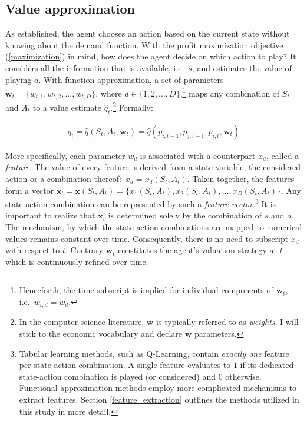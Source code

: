 \subsection{Value approximation}\label{value_approximation}

As established, the agent chooses an action based on the current state without knowing about the demand function. With the profit maximization objective (\autoref{maximization}) in mind, how does the agent decide on which action to play? It considers all the information that is available, i.e.\ $s$, and estimates the value of playing $a$. With function approximation, a set of parameters $\boldsymbol{w}_t = \{w_{t, 1}, w_{t, 2}, ..., w_{t, D}\}$, where $d \in \{1, 2, ..., D\}$,\footnote{Henceforth, the time subscript is implied for individual components of $\boldsymbol{w}_t$, i.e.\ $w_{t,d} = w_d$.} maps any combination of $S_t$ and $A_t$ to a value estimate $\hat{q}_t$.\footnote{In the computer science literature, $\boldsymbol{w}$ is typically referred to as \emph{weights}. I will stick to the economic vocabulary and declare $\boldsymbol{w}$ parameters.} Formally:

\begin{gather}\label{q_estimation}
	\hat{q}_t = \hat{q}(S_t,A_t,\boldsymbol{w}_t) = \hat{q}(p_{i, t-1}, p_{j, t-1}, p_{i, t}, \boldsymbol{w}_t)
\end{gather}

More specifically, each parameter $w_d$ is associated with a counterpart $x_d$, called a \emph{feature}. The value of every feature is derived  from a state variable, the considered action or a combination thereof:\ $x_d = x_d(S_t, A_t)$. Taken together, the features form a vector $\boldsymbol{x}_t = \boldsymbol{x}(S_t, A_t) = \{x_1(S_t, A_t), x_2(S_t, A_t), ..., x_D(S_t, A_t)\}$. Any state-action combination can be represented by such a \emph{feature vector}.\footnote{Tabular learning methods, such as Q-Learning, contain \emph{exactly one} feature per state-action combination. A single feature evaluates to $1$ if its dedicated state-action combination is played (or considered) and $0$ otherwise. Functional approximation methods employ more complicated mechanisms to extract features. Section \ref{feature_extraction} outlines the methods utilized in this study in more detail.} It is important to realize that $\boldsymbol{x}_t$ is determined solely by the combination of $s$ and $a$. The mechanism, by which the state-action combinations are mapped to numerical values remains constant over time. Consequently, there is no need to subscript $x_d$ with respect to $t$. Contrary $\boldsymbol{w}_t$ constitutes the agent's valuation strategy at $t$ which is continuously refined over time.

